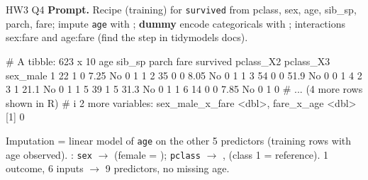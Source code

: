 \begin{qbox}{HW3 Q4}
\textbf{Prompt.} Recipe (training) for \texttt{survived} from pclass, sex, age, sib\_sp, parch, fare; impute \texttt{age} with ; \textbf{dummy} encode categoricals with ; interactions sex:fare and age:fare (find the step in tidymodels docs).
\begin{routput}
# A tibble: 623 x 10
     age sib_sp parch   fare survived pclass_X2 pclass_X3 sex_male
 1    22      1     0   7.25 No               0         1        1
 2    35      0     0   8.05 No               0         1        1
 3    54      0     0  51.9  No               0         0        1
 4     2      3     1  21.1  No               0         1        1
 5    39      1     5  31.3  No               0         1        1
 6    14      0     0   7.85 No               0         1        0
# ... (4 more rows shown in R)
# i 2 more variables: sex_male_x_fare <dbl>, fare_x_age <dbl>
[1] 0
\end{routput}
\ans Imputation = linear model of \texttt{age} on the other 5 predictors (training rows with age observed). : \texttt{sex} $\to$  (female = ); \texttt{pclass} $\to$ ,  (class 1 = reference). 1 outcome, 6 inputs $\to$ 9 predictors, no missing age.
\end{qbox}

